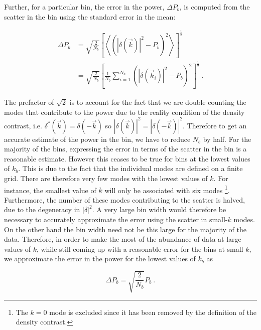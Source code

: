 \documentclass[10pt,letterpaper,final]{iopart}
\numberwithin{equation}{subsection}
\def\ni{\noindent}
\begin{document}
\ni Further, for a particular bin, the error in the power, $\Delta P_b$, is computed from the scatter in the bin using the standard error in the mean:

\begin{align}
\Delta P_{b} &= \sqrt{\frac{2}{N_b}}\left[\left\langle \left( | \delta(\vec{k}) |^2 - P_b \right)^2  \right\rangle \right]^\frac{1}{2} \\
&= \sqrt{\frac{2}{N_b}}\left[\frac{1}{N_b}\sum_{i=1}^{N_b}\left(| \delta(\vec{k}_i) | ^2 - P_b\right)^2\right]^{\frac{1}{2}} \ .
\end{align}

\ni The prefactor of $\sqrt{2}$ is to account for the fact that we are double counting the modes that contribute to the power due to the reality condition of the density contrast, i.e. $\delta^{*}(\vec{k}) = \delta(-\vec{k})$ so $ | \delta(\vec{k}) |^2 = | \delta(-\vec{k}) |^2$. Therefore to get an accurate estimate of the power in the bin, we have to reduce $N_b$ by half. For the majority of the bins, expressing the error in terms of the scatter in the bin is a reasonable estimate. However this ceases to be true for bins at the lowest values of $k_b$. This is due to the fact that the individual modes are defined on a finite grid. There are therefore very few modes with the lowest values of $k$. For instance, the smallest value of $k$ will only be associated with six modes \footnote{The $k=0$ mode is excluded since it has been removed by the definition of the density contrast.}. Furthermore, the number of these modes contributing to the scatter is halved, due to the degeneracy in $|\delta |^2$. A very large bin width would therefore be necessary to accurately approximate the error using the scatter in small-$k$ modes. On the other hand the bin width need not be this large for the majority of the data. Therefore, in order to make the most of the abundance of data at large values of $k$, while still coming up with a reasonable error for the bins at small $k$, we approximate the error in the power for the lowest values of $k_b$ as 

\begin{equation}
\Delta P_b = \sqrt{\frac{2}{N_b}} P_b \ .
\end{equation}
\end{document}

